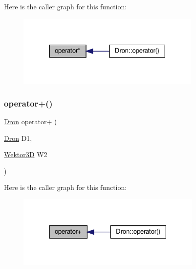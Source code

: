 Here is the caller graph for this function\+:
\nopagebreak
\begin{figure}[H]
\begin{center}
\leavevmode
\includegraphics[width=257pt]{_dron_8hh_a8f9219ec11c21cfdb4178a3ccac3ccc8_icgraph}
\end{center}
\end{figure}
\mbox{\label{_dron_8hh_a81962db5d5d03dc7f8ff67724c88b57d}} 
\subsubsection{\texorpdfstring{operator+()}{operator+()}}
{\footnotesize\ttfamily \hyperlink{class_dron}{Dron} operator+ (\begin{DoxyParamCaption}\item[{\hyperlink{class_dron}{Dron}}]{D1,  }\item[{\hyperlink{_wektor3_d_8hh_ac353a272b38b4ad342f7181ad7bdb91a}{Wektor3D}}]{W2 }\end{DoxyParamCaption})}

Here is the caller graph for this function\+:
\nopagebreak
\begin{figure}[H]
\begin{center}
\leavevmode
\includegraphics[width=259pt]{_dron_8hh_a81962db5d5d03dc7f8ff67724c88b57d_icgraph}
\end{center}
\end{figure}
